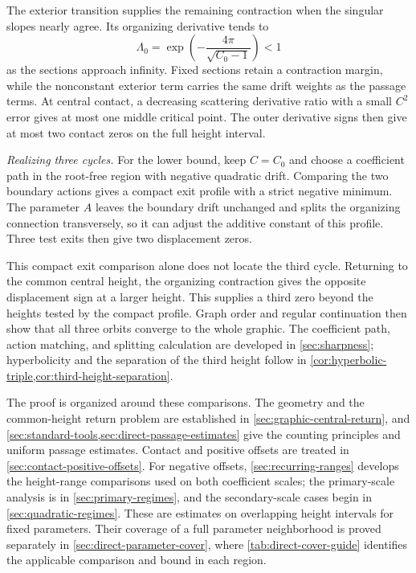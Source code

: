 The exterior transition supplies the remaining contraction when the
singular slopes nearly agree. Its organizing derivative tends to
\[
 \Lambda_0=\exp\!\left(-\frac{4\pi}{\sqrt{C_0-1}}\right)<1
\]
as the sections approach infinity. Fixed sections retain a contraction
margin, while the nonconstant exterior term carries the same drift
weights as the passage terms. At central contact, a decreasing scattering
derivative ratio with a small \(C^2\) error gives at most one middle
critical point. The outer derivative signs then give at most two
contact zeros on the full height interval.

\emph{Realizing three cycles.}
For the lower bound, keep \(C=C_0\) and choose a coefficient path in
the root-free region with negative quadratic drift. Comparing the two
boundary actions gives a compact exit profile with a strict negative
minimum. The parameter \(A\) leaves the boundary drift unchanged and
splits the organizing connection transversely, so it can adjust the
additive constant of this profile. Three test exits then give two
displacement zeros.

This compact exit comparison alone does not locate the third cycle.
Returning to the common central height, the organizing contraction gives
the opposite displacement sign at a larger height. This supplies a third
zero beyond the heights tested by the compact profile. Graph order and
regular continuation then show that all three orbits converge to the
whole graphic. The coefficient path, action matching, and splitting
calculation are developed in \cref{sec:sharpness}; hyperbolicity and the
separation of the third height follow in
\cref{cor:hyperbolic-triple,cor:third-height-separation}.

The proof is organized around these comparisons. The geometry and the
common-height return problem are established in
\cref{sec:graphic-central-return}, and
\cref{sec:standard-tools,sec:direct-passage-estimates} give the counting
principles and uniform passage estimates. Contact and positive offsets
are treated in \cref{sec:contact-positive-offsets}. For negative offsets,
\cref{sec:recurring-ranges} develops the height-range comparisons used on
both coefficient scales; the primary-scale analysis is in
\cref{sec:primary-regimes}, and the secondary-scale cases begin in
\cref{sec:quadratic-regimes}. These are estimates on overlapping height
intervals for fixed parameters. Their coverage of a full parameter
neighborhood is proved separately in \cref{sec:direct-parameter-cover},
where \cref{tab:direct-cover-guide} identifies the applicable comparison
and bound in each region.
